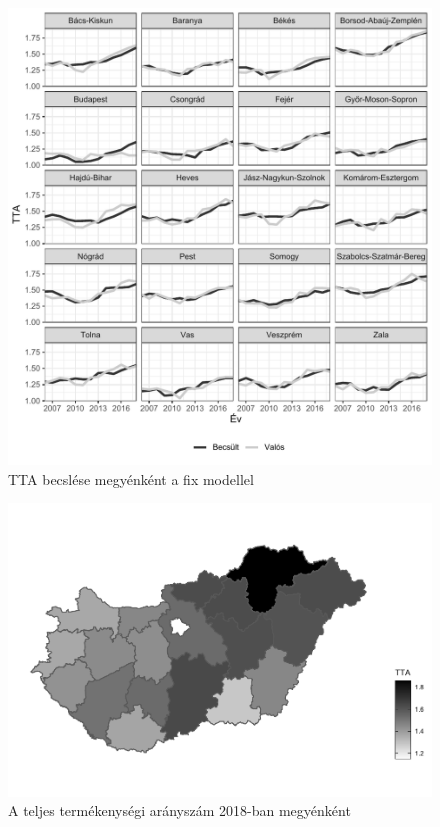 \documentclass[
]{article}
\begin{document}
\begin{figure}
\centering
\includegraphics{ujdemografiaiprogram_files/figure-latex/unnamed-chunk-14-1.pdf}
\caption{TTA becslése megyénként a fix modellel}
\end{figure}

\begin{figure}
\centering
\includegraphics{ujdemografiaiprogram_files/figure-latex/unnamed-chunk-15-1.pdf}
\caption{A teljes termékenységi arányszám 2018-ban megyénként}
\end{figure}
\end{document}
